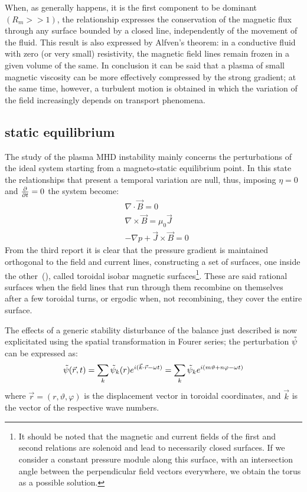 When, as generally happens, it is the first component to be dominant $(R_m >> 1)$, the relationship expresses the conservation of the magnetic flux through any surface bounded by a closed line, independently of the movement of the fluid. This result is also expressed by Alfven's theorem: in a conductive fluid with zero (or very small) resistivity, the magnetic field lines remain frozen in a given volume of the same.
In conclusion it can be said that a plasma of small magnetic viscosity can be more effectively compressed by the strong gradient; at the same time, however, a turbulent motion is obtained in which the variation of the field increasingly depends on transport phenomena.

\subsection{static equilibrium}
The study of the plasma MHD instability mainly concerns the perturbations of the ideal system starting from a magneto-static equilibrium point. In this state the relationships that present a temporal variation are null, thus, imposing $\eta=0$ and $\pdv{}{t} = 0$ the system become:
\begin{align}
    & \nabla \cdot \Vec{B} = 0 \\
    & \nabla \times \Vec{B} = \mu_0 \Vec{J} \\
    & -\nabla p + \Vec{J} \times \Vec{B} = 0
\end{align}
From the third report it is clear that the pressure gradient is maintained orthogonal to the field and current lines, constructing a set of surfaces, one inside the other~(\Figure{}), called toroidal isobar magnetic surfaces\footnote{It should be noted that the magnetic and current fields of the first and second relations are solenoid and lead to necessarily closed surfaces. If we consider a constant pressure module along this surface, with an intersection angle between the perpendicular field vectors everywhere, we obtain the torus as a possible solution.}. These are said rational surfaces when the field lines that run through them recombine on themselves after a few toroidal turns, or ergodic when, not recombining, they cover the entire surface.

The effects of a generic stability disturbance of the balance just described is now explicitated using the spatial transformation in Fourer series; the perturbation $\Tilde{\psi}$ can be expressed as:
\begin{equation}
    \Tilde{\psi}(\Vec{r},t) = \sum_k \Tilde{\psi}_k(r) e^{i(\Vec{k}\cdot\Vec{r}-\omega t)} = \sum_k \Tilde{\psi}_k e^{i(m\vartheta+n\varphi-\omega t)}
\end{equation}
where $\Vec{r} = (r,\vartheta,\varphi)$ is the displacement vector in toroidal coordinates, and $\Vec{k}$ is the vector of the respective wave numbers.

